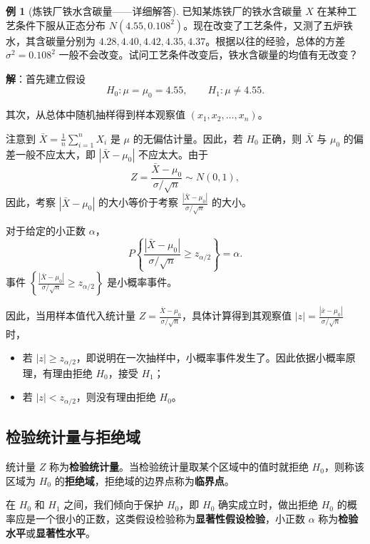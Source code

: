 \documentclass[11pt,a4paper]{report}
\theoremstyle{definition}
\newtheorem{example}{例}[chapter]
\begin{document}
\begin{example}[炼铁厂铁水含碳量——详细解答]
已知某炼铁厂的铁水含碳量 $X$ 在某种工艺条件下服从正态分布 $N(4.55,0.108^{2})$。现在改变了工艺条件，又测了五炉铁水，其含碳量分别为 $4.28, 4.40, 4.42, 4.35, 4.37$。根据以往的经验，总体的方差 $\sigma^{2}=0.108^{2}$ 一般不会改变。试问工艺条件改变后，铁水含碳量的均值有无改变？

\textbf{解}：首先建立假设
\[
H_{0}\colon\mu=\mu_{0}=4.55,\qquad H_{1}\colon\mu\neq 4.55.
\]

其次，从总体中随机抽样得到样本观察值 $(x_{1},x_{2},\ldots,x_{n})$。

注意到 $\bar{X}=\frac{1}{n}\sum_{i=1}^{n}X_{i}$ 是 $\mu$ 的无偏估计量。因此，若 $H_{0}$ 正确，则 $\bar{X}$ 与 $\mu_{0}$ 的偏差一般不应太大，即 $|\bar{X}-\mu_{0}|$ 不应太大。由于
\[
Z=\frac{\bar{X}-\mu_{0}}{\sigma/\sqrt{n}}\sim N(0,1),
\]
因此，考察 $|\bar{X}-\mu_{0}|$ 的大小等价于考察 $\frac{|\bar{X}-\mu_{0}|}{\sigma/\sqrt{n}}$ 的大小。

对于给定的小正数 $\alpha$，
\[
P\left\{\frac{|\bar{X}-\mu_{0}|}{\sigma/\sqrt{n}}\geq z_{\alpha/2}\right\}=\alpha.
\]
事件 $\left\{\frac{|\bar{X}-\mu_{0}|}{\sigma/\sqrt{n}}\geq z_{\alpha/2}\right\}$ 是小概率事件。

因此，当用样本值代入统计量 $Z=\frac{\bar{X}-\mu_{0}}{\sigma/\sqrt{n}}$，具体计算得到其观察值 $|z|=\frac{|\bar{x}-\mu_{0}|}{\sigma/\sqrt{n}}$ 时，
\begin{itemize}[leftmargin=2em]
    \item 若 $|z|\geq z_{\alpha/2}$，即说明在一次抽样中，小概率事件发生了。因此依据小概率原理，有理由拒绝 $H_{0}$，接受 $H_{1}$；
    \item 若 $|z|<z_{\alpha/2}$，则没有理由拒绝 $H_{0}$。
\end{itemize}
\end{example}

\subsection{检验统计量与拒绝域}

统计量 $Z$ 称为\textbf{检验统计量}。当检验统计量取某个区域中的值时就拒绝 $H_{0}$，则称该区域为 $H_{0}$ 的\textbf{拒绝域}，拒绝域的边界点称为\textbf{临界点}。

在 $H_{0}$ 和 $H_{1}$ 之间，我们倾向于保护 $H_{0}$，即 $H_{0}$ 确实成立时，做出拒绝 $H_{0}$ 的概率应是一个很小的正数，这类假设检验称为\textbf{显著性假设检验}，小正数 $\alpha$ 称为\textbf{检验水平}或\textbf{显著性水平}。
\end{document}
